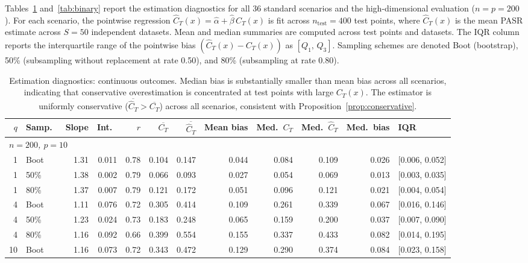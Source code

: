 \documentclass[11pt]{article}
\theoremstyle{plain}
\theoremstyle{definition}
\theoremstyle{remark}
\begin{document}
Tables~\ref{tab:continuous} and~\ref{tab:binary} report the estimation diagnostics for all 36 standard scenarios and the high-dimensional evaluation ($n = p = 200$). For each scenario, the pointwise regression $\widehat C_T(x) = \hat\alpha + \hat\beta\, C_T(x)$ is fit across $n_{\mathrm{test}} = 400$ test points, where $\widehat C_T(x)$ is the mean PASR estimate across $S = 50$ independent datasets. Mean and median summaries are computed across test points and datasets. The IQR column reports the interquartile range of the pointwise bias $(\widehat C_T(x) - C_T(x))$ as $[Q_1,\, Q_3]$. Sampling schemes are denoted Boot (bootstrap), 50\% (subsampling without replacement at rate 0.50), and 80\% (subsampling at rate 0.80).

\begin{table}[htbp!]
	\centering
	\footnotesize
	\caption{Estimation diagnostics: continuous outcomes. Median bias is substantially smaller than mean bias across all scenarios, indicating that conservative overestimation is concentrated at test points with large $C_T(x)$. The estimator is uniformly conservative ($\overline{\widehat C_T} > \overline{C_T}$) across all scenarios, consistent with Proposition~\ref{prop:conservative}.}
	\label{tab:continuous}
	\begin{tabular}{rlrrrrrrrrrl}
		\hline
		$q$ & Samp.\ & Slope & Int.\ & $r$ & $\overline{C_T}$ & $\overline{\widehat C_T}$ & Mean bias & Med.\ $C_T$ & Med.\ $\widehat C_T$ & Med.\ bias & IQR \\
		\hline
		\multicolumn{12}{l}{\textit{$n = 200$, $p = 10$}} \\[2pt]
		1  & Boot & 1.31 & 0.011    & 0.78 & 0.104 & 0.147 & 0.044 & 0.084 & 0.109 & 0.026 & [0.006, 0.052] \\
		1  & 50\% & 1.38 & 0.002    & 0.79 & 0.066 & 0.093 & 0.027 & 0.054 & 0.069 & 0.013 & [0.003, 0.035] \\
		1  & 80\% & 1.37 & 0.007    & 0.79 & 0.121 & 0.172 & 0.051 & 0.096 & 0.121 & 0.021 & [0.004, 0.054] \\
		4  & Boot & 1.11 & 0.076    & 0.72 & 0.305 & 0.414 & 0.109 & 0.261 & 0.339 & 0.067 & [0.016, 0.146] \\
		4  & 50\% & 1.23 & 0.024    & 0.73 & 0.183 & 0.248 & 0.065 & 0.159 & 0.200 & 0.037 & [0.007, 0.090] \\
		4  & 80\% & 1.16 & 0.092    & 0.66 & 0.399 & 0.554 & 0.155 & 0.337 & 0.433 & 0.082 & [0.014, 0.195] \\
		10 & Boot & 1.16 & 0.073    & 0.72 & 0.343 & 0.472 & 0.129 & 0.290 & 0.374 & 0.084 & [0.023, 0.158] \\

\end{tabular}
\end{table}
\end{document}
